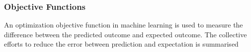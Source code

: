 \subsubsection{Objective Functions}
An optimization objective function in machine learning is used to measure the difference between the predicted outcome and expected outcome. The collective efforts to reduce the error between prediction and expectation is summarised 